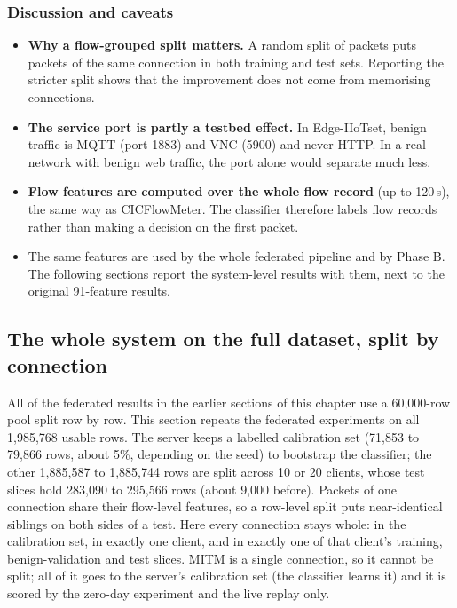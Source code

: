 \subsubsection{Discussion and caveats}
\begin{itemize}
  \item \textbf{Why a flow-grouped split matters.} A random split of packets puts packets of the same connection in both training and test sets. Reporting the stricter split shows that the improvement does not come from memorising connections.
  \item \textbf{The service port is partly a testbed effect.} In Edge-IIoTset, benign traffic is MQTT (port 1883) and VNC (5900) and never HTTP. In a real network with benign web traffic, the port alone would separate much less.
  \item \textbf{Flow features are computed over the whole flow record} (up to 120\,s), the same way as CICFlowMeter. The classifier therefore labels flow records rather than making a decision on the first packet.
  \item The same features are used by the whole federated pipeline and by Phase B. The following sections report the system-level results with them, next to the original 91-feature results.
\end{itemize}

\subsection{The whole system on the full dataset, split by connection}\label{sec:fullpool}
All of the federated results in the earlier sections of this chapter use a 60{,}000-row pool split row by row. This section repeats the federated experiments on all 1{,}985{,}768 usable rows. The server keeps a labelled calibration set (71{,}853 to 79{,}866 rows, about 5\%, depending on the seed) to bootstrap the classifier; the other 1{,}885{,}587 to 1{,}885{,}744 rows are split across 10 or 20 clients, whose test slices hold 283{,}090 to 295{,}566 rows (about 9{,}000 before). Packets of one connection share their flow-level features, so a row-level split puts near-identical siblings on both sides of a test. Here every connection stays whole: in the calibration set, in exactly one client, and in exactly one of that client's training, benign-validation and test slices. MITM is a single connection, so it cannot be split; all of it goes to the server's calibration set (the classifier learns it) and it is scored by the zero-day experiment and the live replay only.

